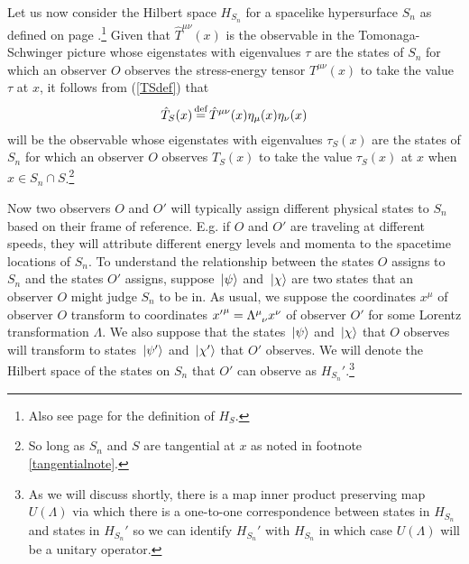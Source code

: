 Let us now consider the Hilbert space $H_{S_n}$  for a spacelike hypersurface $S_n$ as defined on page \pageref{HSidef}.\footnote{Also see page \pageref{HSdef} for the definition of $H_S$.} 
Given that $\hat{T}^{\mu\nu}(x)$ is the observable in the Tomonaga-Schwinger picture whose eigenstates with eigenvalues $\tau$ are the states of $S_n$ for which an observer $O$ observes the stress-energy tensor $T^{\mu\nu}(x)$ to take the value $\tau$ at $x$, it follows from (\ref{TSdef}) that 
\begin{equation}\label{TShat}
	\hat{T}_S(x)\myeq \hat{T}^{\mu\nu}(x)\eta_{\mu}(x)\eta_{\nu}(x)
	\end{equation}
will be the observable whose eigenstates with eigenvalues $\tau_S(x)$ are the states of $S_n$ for which an observer $O$ observes $T_S(x)$ to take the value $\tau_S(x)$ at $x$ when $x\in S_n\cap S$.\footnote{So long as $S_n$ and $S$ are tangential at $x$ as noted in footnote \ref{tangentialnote}.}
 
Now two observers $O$ and $O'$ will typically assign different physical states to $S_n$ based on their frame of reference. E.g. if $O$ and $O'$ are traveling at different speeds, they will attribute different energy levels and momenta to the spacetime locations of $S_n$. To understand the relationship between the states $O$ assigns to $S_n$ and the states $O'$ assigns, suppose $\ket*{\psi}$ and  $\ket*{\chi}$ are two states that an observer $O$ might judge $S_n$ to be in. As usual, we suppose the coordinates $x^\mu$ of observer $O$ transform to coordinates ${x'}^\mu=\Lambda\indices{^\mu_\nu}x^\nu$ of observer $O'$ for some Lorentz transformation $\Lambda.$ We also suppose that the states $\ket*{\psi}$ and $\ket*{\chi}$ that $O$ observes will transform to states $\ket*{\psi'}$  and $\ket*{\chi'}$ that $O'$ observes. We will denote the Hilbert space of the states on $S_n$ that $O'$ can observe as $H_{S_n}'$.\label{Hprimespace}\footnote{As we will discuss shortly, there is a map inner product preserving map $U(\Lambda)$ via which there is a one-to-one correspondence between states in $H_{S_n}$ and states in $H_{S_n}'$ so we can identify $H_{S_n}'$ with $H_{S_n}$ in which case $U(\Lambda)$ will be a unitary operator.}

